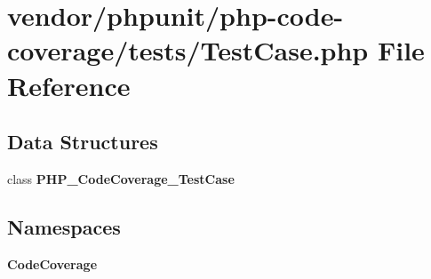 \section{vendor/phpunit/php-\/code-\/coverage/tests/\+Test\+Case.php File Reference}
\label{vendor_2phpunit_2php-code-coverage_2tests_2_test_case_8php}
\subsection*{Data Structures}
\begin{DoxyCompactItemize}
\item 
class {\bf P\+H\+P\+\_\+\+Code\+Coverage\+\_\+\+Test\+Case}
\end{DoxyCompactItemize}
\subsection*{Namespaces}
\begin{DoxyCompactItemize}
\item 
 {\bf Code\+Coverage}
\end{DoxyCompactItemize}
